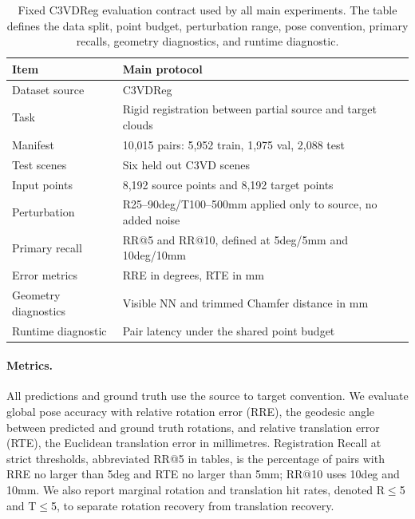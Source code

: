 \documentclass{bmvc2k}
\begin{document}
\begin{table}[t]
\centering
\caption{Fixed C3VDReg evaluation contract used by all main experiments. The table defines the data split, point budget, perturbation range, pose convention, primary recalls, geometry diagnostics, and runtime diagnostic.}
\label{tab:protocol}
\small
\begin{tabular}{ll}
\hline
Item & Main protocol \\
\hline
Dataset source & C3VDReg \\
Task & Rigid registration between partial source and target clouds \\
Manifest & 10,015 pairs: 5,952 train, 1,975 val, 2,088 test \\
Test scenes & Six held out C3VD scenes \\
Input points & 8,192 source points and 8,192 target points \\
Perturbation & R25--90deg/T100--500mm applied only to source, no added noise \\
Primary recall & RR@5 and RR@10, defined at 5deg/5mm and 10deg/10mm \\
Error metrics & RRE in degrees, RTE in mm \\
Geometry diagnostics & Visible NN and trimmed Chamfer distance in mm \\
Runtime diagnostic & Pair latency under the shared point budget \\
\hline
\end{tabular}
\end{table}

\paragraph{Metrics.}
\label{sec:metrics}

All predictions and ground truth use the source to target convention. We evaluate global pose accuracy with relative rotation error (RRE), the geodesic angle between predicted and ground truth rotations, and relative translation error (RTE), the Euclidean translation error in millimetres. Registration Recall at strict thresholds, abbreviated RR@5 in tables, is the percentage of pairs with RRE no larger than 5deg and RTE no larger than 5mm; RR@10 uses 10deg and 10mm. We also report marginal rotation and translation hit rates, denoted R$\leq$5 and T$\leq$5, to separate rotation recovery from translation recovery.
\end{document}

